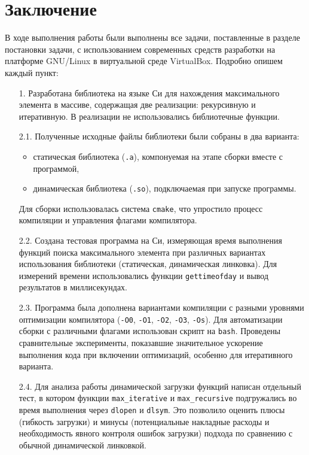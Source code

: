 \section*{Заключение}

В ходе выполнения работы были выполнены все задачи, поставленные в разделе постановки задачи, с использованием современных средств разработки на платформе GNU/Linux в виртуальной среде VirtualBox. Подробно опишем каждый пункт:

\begin{itemize}
    \item[1.] Разработана библиотека на языке Си для нахождения максимального элемента в массиве, содержащая две реализации: рекурсивную и итеративную. В реализации не использовались библиотечные функции.

    \item[2.1.] Полученные исходные файлы библиотеки были собраны в два варианта:
    \begin{itemize}
        \item статическая библиотека (\texttt{.a}), компонуемая на этапе сборки вместе с программой,
        \item динамическая библиотека (\texttt{.so}), подключаемая при запуске программы.
    \end{itemize}
    Для сборки использовалась система \texttt{cmake}, что упростило процесс компиляции и управления флагами компилятора.

    \item[2.2.] Создана тестовая программа на Си, измеряющая время выполнения функций поиска максимального элемента при различных вариантах использования библиотеки (статическая, динамическая линковка). Для измерений времени использовались функции \texttt{gettimeofday} и вывод результатов в миллисекундах. 

    \item[2.3.] Программа была дополнена вариантами компиляции с разными уровнями оптимизации компилятора (\texttt{-O0}, \texttt{-O1}, \texttt{-O2}, \texttt{-O3}, \texttt{-Os}). Для автоматизации сборки с различными флагами использован скрипт на \texttt{bash}. Проведены сравнительные эксперименты, показавшие значительное ускорение выполнения кода при включении оптимизаций, особенно для итеративного варианта.

    \item[2.4.] Для анализа работы динамической загрузки функций написан отдельный тест, в котором функции \texttt{max\_iterative} и \texttt{max\_recursive} подгружались во время выполнения через \texttt{dlopen} и \texttt{dlsym}. Это позволило оценить плюсы (гибкость загрузки) и минусы (потенциальные накладные расходы и необходимость явного контроля ошибок загрузки) подхода по сравнению с обычной динамической линковкой.


\end{itemize}
